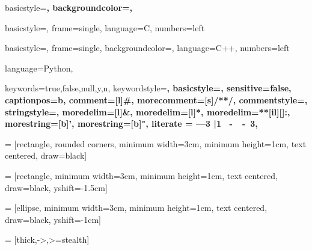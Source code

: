    {basicstyle=\scriptsize\bf\ttfamily,
    backgroundcolor=\color{gray75},    
    }

   {basicstyle=\scriptsize,
	frame=single,
	language=C,
	numbers=left
   }
   
   {basicstyle=\small,
	frame=single,
	backgroundcolor=\color{gray75},
	language=C++,
	numbers=left
   }

   {language=Python,    
   }

{
   keywords={true,false,null,y,n},
   keywordstyle=\bfseries,
   basicstyle=\bfseries,
   sensitive=false,
   captionpos=b,
   comment=[l]{\#},
   morecomment=[s]{/*}{*/},
   commentstyle=\ttfamily,
   stringstyle=\mdseries\ttfamily,
   moredelim=[l]{\&},
   moredelim=[l]{*},
   moredelim=**[il][\mdseries{:}\mdseries]{:},
   morestring=[b]',
   morestring=[b]",
   literate =  {---}{{\llap{\mdseries-{-}-}}}3    
               {|}{{\textbar}}1 
               {\ -\ }{{\mdseries\ -\ }}3,
}


\usepackage[textwidth=2.5cm, textsize=smaller]{todonotes}
\setlength{\marginparwidth}{2.5cm}

\usepackage{lipsum}

\usepackage{relsize}

\usepackage{blindtext}
\linespread{1.3}

\usepackage{tikz}
\usetikzlibrary{shapes, positioning, calc}

 = [rectangle, rounded corners, minimum width=3cm, minimum height=1cm, text centered, draw=black]

 = [rectangle, minimum width=3cm, minimum height=1cm, text centered, draw=black, yshift=-1.5cm]

 = [ellipse, minimum width=3cm, minimum height=1cm, text centered, draw=black, yshift=-1cm]

 = [thick,->,>=stealth]

\usepackage{pgf-umlcd}
\usepackage{csquotes}
